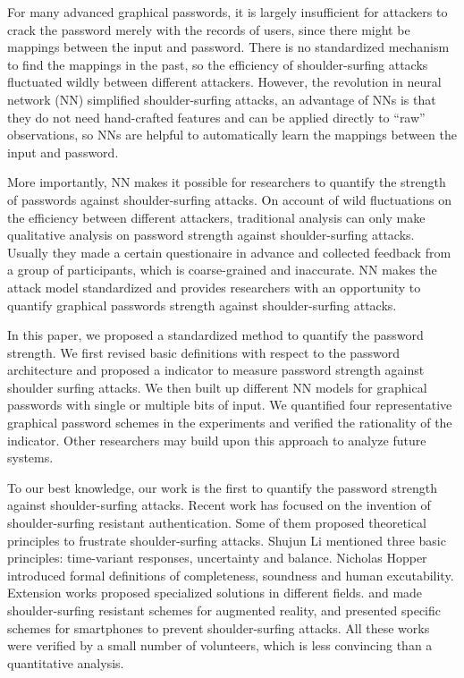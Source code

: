\documentclass{article}
\begin{document}
  For many advanced graphical passwords, it is largely insufficient for attackers to crack the password merely 
  with the records of users, since there might be mappings between the input and password. There is no 
  standardized mechanism to find the mappings in the past, so the efficiency of shoulder-surfing attacks fluctuated 
  wildly between different attackers. However, the revolution in neural network (NN) simplified 
  shoulder-surfing attacks, an advantage of NNs is that they do not need hand-crafted features and can be 
  applied directly to “raw” observations, so NNs are helpful to automatically learn the mappings between the 
  input and password. 
  
  More importantly, NN makes it possible for researchers to quantify the strength of passwords against 
  shoulder-surfing attacks. On account of wild fluctuations on the efficiency between different attackers, 
  traditional analysis can only make qualitative analysis on password strength against shoulder-surfing attacks. 
  Usually they made a certain questionaire in advance and collected feedback from a group of participants, which 
  is coarse-grained and inaccurate. NN makes the attack model standardized and provides researchers with an opportunity 
  to quantify graphical passwords strength against shoulder-surfing attacks. 
  
  In this paper, we proposed a standardized method to quantify the password strength. We first revised basic 
  definitions with respect to the password architecture and proposed a indicator to measure password strength against 
  shoulder surfing attacks. We then built up different NN models for graphical passwords with 
  single or multiple bits of input. We quantified four representative graphical password schemes in the experiments and verified 
  the rationality of the indicator. Other researchers may build upon this approach to analyze future systems.
  
  To our best knowledge, our work is the first to quantify the password strength against shoulder-surfing 
  attacks. Recent work has focused on the invention of shoulder-surfing resistant authentication. Some of them 
  proposed theoretical principles to frustrate shoulder-surfing attacks. Shujun Li \cite{DBLP:journals/iacr/LiS05} 
  mentioned three basic principles: time-variant responses, uncertainty and balance. Nicholas Hopper 
  \cite{Hopper:2001:SHI:647097.717000} introduced formal definitions of completeness, soundness and human 
  excutability. Extension works proposed specialized solutions in different fields. 
  \cite{DBLPHK17} and \cite{DBLPJW17} made shoulder-surfing resistant schemes 
  for augmented reality, \cite{DBLP:journals/mta/LuoY16} and \cite{DBLPOF15} presented 
  specific schemes for smartphones to prevent shoulder-surfing attacks. All these works were verified by a small 
  number of volunteers, which is less convincing than a quantitative analysis.
  
\end{document}
